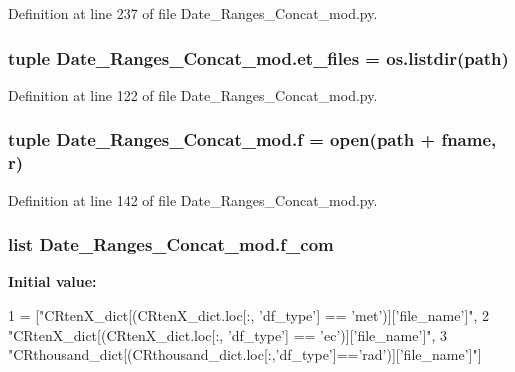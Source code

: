 Definition at line 237 of file Date\+\_\+\+Ranges\+\_\+\+Concat\+\_\+mod.\+py.

\hypertarget{namespace_date___ranges___concat__mod_a5df2cb82df527210abe5d9839e6742d3}{}
\subsubsection[{et\+\_\+files}]{\setlength{\rightskip}{0pt plus 5cm}tuple Date\+\_\+\+Ranges\+\_\+\+Concat\+\_\+mod.\+et\+\_\+files = os.\+listdir({\bf path})}\label{namespace_date___ranges___concat__mod_a5df2cb82df527210abe5d9839e6742d3}


Definition at line 122 of file Date\+\_\+\+Ranges\+\_\+\+Concat\+\_\+mod.\+py.

\hypertarget{namespace_date___ranges___concat__mod_a703db4502ab158179b3d9fe9cef2192f}{}
\subsubsection[{f}]{\setlength{\rightskip}{0pt plus 5cm}tuple Date\+\_\+\+Ranges\+\_\+\+Concat\+\_\+mod.\+f = open({\bf path} + fname, \textquotesingle{}r\textquotesingle{})}\label{namespace_date___ranges___concat__mod_a703db4502ab158179b3d9fe9cef2192f}


Definition at line 142 of file Date\+\_\+\+Ranges\+\_\+\+Concat\+\_\+mod.\+py.

\hypertarget{namespace_date___ranges___concat__mod_a35c7680de747e23cf993a72703f9ac07}{}
\subsubsection[{f\+\_\+com}]{\setlength{\rightskip}{0pt plus 5cm}list Date\+\_\+\+Ranges\+\_\+\+Concat\+\_\+mod.\+f\+\_\+com}\label{namespace_date___ranges___concat__mod_a35c7680de747e23cf993a72703f9ac07}
{\bfseries Initial value\+:}
\begin{DoxyCode}
1 = [\textcolor{stringliteral}{"CRtenX\_dict[(CRtenX\_dict.loc[:, 'df\_type'] == 'met')]['file\_name']"},
2              \textcolor{stringliteral}{"CRtenX\_dict[(CRtenX\_dict.loc[:, 'df\_type'] == 'ec')]['file\_name']"},
3              \textcolor{stringliteral}{"CRthousand\_dict[(CRthousand\_dict.loc[:,'df\_type']=='rad')]['file\_name']"}]
\end{DoxyCode}


